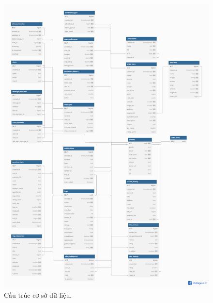 \begin{figure}[H]
    \centering  
    \includegraphics[width=1\textwidth]{figures/c3/test5.png}
    \caption{Cấu trúc cơ sở dữ liệu.}
    \label{fig:3-4-database}
\end{figure}

